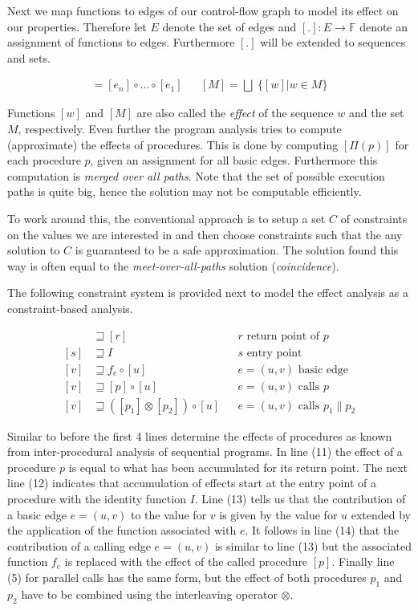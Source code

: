 \documentclass[article]{uibk}
\begin{document}
Next we map functions to edges of our control-flow graph to model its effect on
our properties. Therefore let $E$ denote the set of edges and $[.] : E \to
\mathbb{F}$ denote an assignment of functions to edges. Furthermore $[.]$ will
be extended to sequences and sets.

\begin{align*}
    [w] = [e_n] \circ \dots \circ [e_1] && [M] = \bigsqcup\;\{[w] | w \in M\}
\end{align*}

Functions $[w]$ and $[M]$ are also called the \textit{effect} of the sequence
$w$ and the set $M$, respectively. Even further the program analysis tries to
compute (approximate) the effects of procedures. This is done by computing
$[\Pi(p)]$ for each procedure $p$, given an assignment for all basic edges.
Furthermore this computation is \textit{merged over all paths}. Note that the
set of possible execution paths is quite big, hence the solution may not be
computable efficiently.

To work around this, the conventional approach is to setup a set $C$ of
constraints on the values we are interested in and then choose constraints such
that the any solution to $C$ is guaranteed to be a safe approximation. The
solution found this way is often equal to the \textit{meet-over-all-paths}
solution (\textit{coincidence}).

The following constraint system is provided next to model the effect analysis
as a constraint-based analysis.

\begin{align}
    [p] &\sqsupseteq [r]                             && \text{$r$ return point of $p$} \\
    [s] &\sqsupseteq I                               && \text{$s$ entry point} \\
    [v] &\sqsupseteq f_e \circ [u]                   && \text{$e = (u,v)$ basic edge} \\
    [v] &\sqsupseteq [p] \circ [u]                   && \text{$e = (u,v)$ calls $p$} \\
    [v] &\sqsupseteq ([p_1] \otimes [p_2]) \circ [u] && \text{$e = (u,v)$ calls $p_1 \parallel p_2$}
\end{align}

Similar to before the first 4 lines determine the effects of procedures as
known from inter-procedural analysis of sequential programs. In line (11) the
effect of a procedure $p$ is equal to what has been accumulated for its return
point. The next line (12) indicates that accumulation of effects start at the
entry point of a procedure with the identity function $I$. Line (13) tells us
that the contribution of a basic edge $e = (u,v)$ to the value for $v$ is given
by the value for $u$ extended by the application of the function associated
with $e$. It follows in line (14) that the contribution of a calling edge $e =
(u,v)$ is similar to line (13) but the associated function $f_e$ is replaced
with the effect of the called procedure $[p]$. Finally line (5) for parallel
calls has the same form, but the effect of both procedures $p_1$ and $p_2$ have
to be combined using the interleaving operator $\otimes$.
\end{document}
